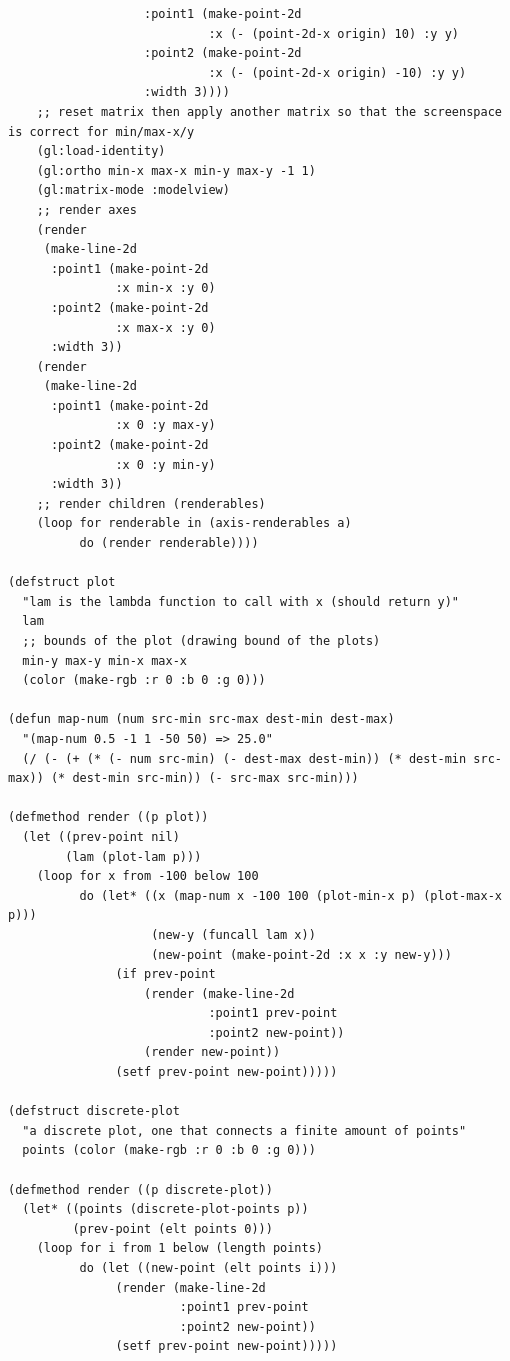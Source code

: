 \documentclass[a4paper,12pt]{article}
\begin{document}
\begin{lstlisting}
                   :point1 (make-point-2d
                            :x (- (point-2d-x origin) 10) :y y)
                   :point2 (make-point-2d
                            :x (- (point-2d-x origin) -10) :y y)
                   :width 3))))
    ;; reset matrix then apply another matrix so that the screenspace is correct for min/max-x/y
    (gl:load-identity)
    (gl:ortho min-x max-x min-y max-y -1 1)
    (gl:matrix-mode :modelview)
    ;; render axes
    (render
     (make-line-2d
      :point1 (make-point-2d
               :x min-x :y 0)
      :point2 (make-point-2d
               :x max-x :y 0)
      :width 3))
    (render
     (make-line-2d
      :point1 (make-point-2d
               :x 0 :y max-y)
      :point2 (make-point-2d
               :x 0 :y min-y)
      :width 3))
    ;; render children (renderables)
    (loop for renderable in (axis-renderables a)
          do (render renderable))))

(defstruct plot
  "lam is the lambda function to call with x (should return y)"
  lam
  ;; bounds of the plot (drawing bound of the plots)
  min-y max-y min-x max-x
  (color (make-rgb :r 0 :b 0 :g 0)))

(defun map-num (num src-min src-max dest-min dest-max)
  "(map-num 0.5 -1 1 -50 50) => 25.0"
  (/ (- (+ (* (- num src-min) (- dest-max dest-min)) (* dest-min src-max)) (* dest-min src-min)) (- src-max src-min)))

(defmethod render ((p plot))
  (let ((prev-point nil)
        (lam (plot-lam p)))
    (loop for x from -100 below 100
          do (let* ((x (map-num x -100 100 (plot-min-x p) (plot-max-x p)))
                    (new-y (funcall lam x))
                    (new-point (make-point-2d :x x :y new-y)))
               (if prev-point
                   (render (make-line-2d
                            :point1 prev-point
                            :point2 new-point))
                   (render new-point))
               (setf prev-point new-point)))))

(defstruct discrete-plot
  "a discrete plot, one that connects a finite amount of points"
  points (color (make-rgb :r 0 :b 0 :g 0)))

(defmethod render ((p discrete-plot))
  (let* ((points (discrete-plot-points p))
         (prev-point (elt points 0)))
    (loop for i from 1 below (length points)
          do (let ((new-point (elt points i)))
               (render (make-line-2d
                        :point1 prev-point
                        :point2 new-point))
               (setf prev-point new-point)))))
\end{lstlisting}
\end{document}
